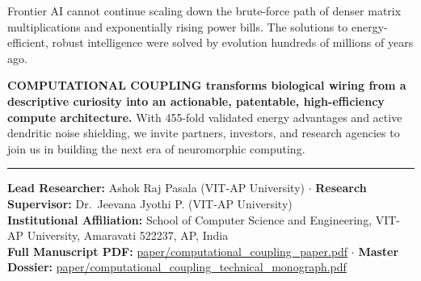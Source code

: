 \documentclass[11pt,letterpaper]{article}
\begin{document}
\vspace{10pt}

\begin{tcolorbox}[colback=brandblue!10!white, colframe=brandblue, title=\textbf{Summary: The Future of Computing is Biologically Coupled}]
Frontier AI cannot continue scaling down the brute-force path of denser matrix multiplications and exponentially rising power bills. The solutions to energy-efficient, robust intelligence were solved by evolution hundreds of millions of years ago. 

\textbf{COMPUTATIONAL COUPLING transforms biological wiring from a descriptive curiosity into an actionable, patentable, high-efficiency compute architecture.} With 455-fold validated energy advantages and active dendritic noise shielding, we invite partners, investors, and research agencies to join us in building the next era of neuromorphic computing.
\end{tcolorbox}

\vspace{14pt}
\hrule
\vspace{6pt}
\small
\noindent \textbf{Lead Researcher:} Ashok Raj Pasala (VIT-AP University) $\cdot$ \textbf{Research Supervisor:} Dr.~Jeevana Jyothi P. (VIT-AP University)\\
\textbf{Institutional Affiliation:} School of Computer Science and Engineering, VIT-AP University, Amaravati 522237, AP, India\\
\textbf{Full Manuscript PDF:} \url{paper/computational_coupling_paper.pdf} $\cdot$ \textbf{Master Dossier:} \url{paper/computational_coupling_technical_monograph.pdf}
\end{document}
